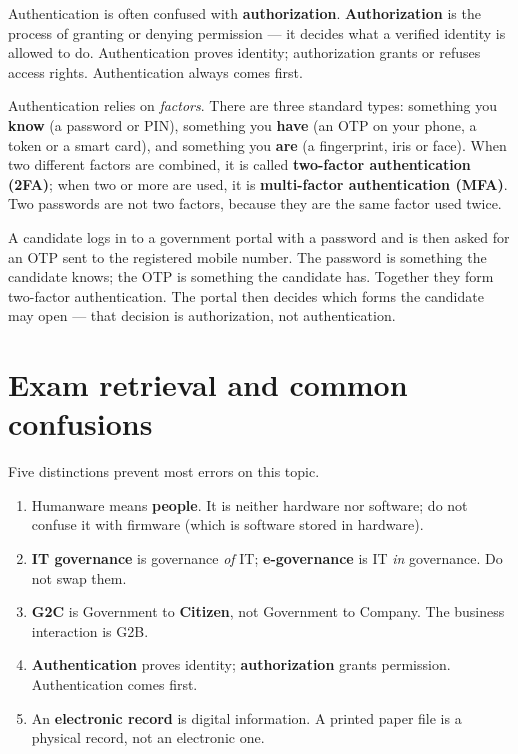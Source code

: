 Authentication is often confused with \textbf{authorization}.
\textbf{Authorization} is the process of granting or denying permission ---
it decides what a verified identity is allowed to do. Authentication proves
identity; authorization grants or refuses access rights. Authentication
always comes first.

Authentication relies on \emph{factors}. There are three standard types:
something you \textbf{know} (a password or PIN), something you \textbf{have}
(an OTP on your phone, a token or a smart card), and something you \textbf{are}
(a fingerprint, iris or face). When two different factors are combined, it is
called \textbf{two-factor authentication (2FA)}; when two or more are used, it
is \textbf{multi-factor authentication (MFA)}. Two passwords are not two
factors, because they are the same factor used twice.

\begin{example}
A candidate logs in to a government portal with a password and is then asked
for an OTP sent to the registered mobile number. The password is something the
candidate knows; the OTP is something the candidate has. Together they form
two-factor authentication. The portal then decides which forms the candidate
may open --- that decision is authorization, not authentication.
\end{example}

\section{Exam retrieval and common confusions}
Five distinctions prevent most errors on this topic.
\begin{enumerate}
  \item Humanware means \textbf{people}. It is neither hardware nor software;
    do not confuse it with firmware (which is software stored in hardware).
  \item \textbf{IT governance} is governance \emph{of} IT;
    \textbf{e-governance} is IT \emph{in} governance. Do not swap them.
  \item \textbf{G2C} is Government to \textbf{Citizen}, not Government to
    Company. The business interaction is G2B.
  \item \textbf{Authentication} proves identity; \textbf{authorization}
    grants permission. Authentication comes first.
  \item An \textbf{electronic record} is digital information. A printed paper
    file is a physical record, not an electronic one.
\end{enumerate}

